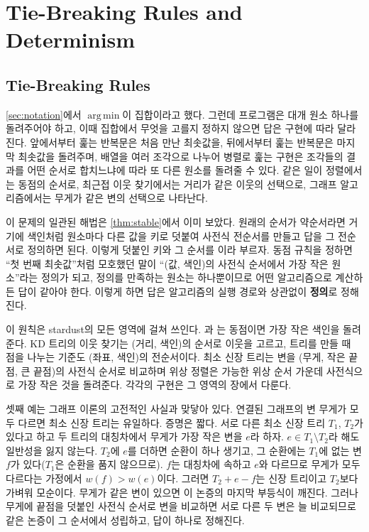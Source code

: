 \section{Tie-Breaking Rules and Determinism}
\label{sec:ties}

\subsection{Tie-Breaking Rules}

\cref{sec:notation}에서 $\operatorname{arg\,min}$이 집합이라고 했다. 그런데 프로그램은 대개 원소 하나를 돌려주어야 하고, 이때 집합에서 무엇을 고를지 정하지 않으면 답은 구현에 따라 달라진다. 앞에서부터 훑는 반복문은 처음 만난 최솟값을, 뒤에서부터 훑는 반복문은 마지막 최솟값을 돌려주며, 배열을 여러 조각으로 나누어 병렬로 훑는 구현은 조각들의 결과를 어떤 순서로 합치느냐에 따라 또 다른 원소를 돌려줄 수 있다. 같은 일이 정렬에서는 동점의 순서로, 최근접 이웃 찾기에서는 거리가 같은 이웃의 선택으로, 그래프 알고리즘에서는 무게가 같은 변의 선택으로 나타난다.

이 문제의 일관된 해법은 \cref{thm:stable}에서 이미 보았다. 원래의 순서가 약순서라면 거기에 색인처럼 원소마다 다른 값을 키로 덧붙여 사전식 전순서를 만들고 답을 그 전순서로 정의하면 된다. 이렇게 덧붙인 키와 그 순서를 이라 부르자. 동점 규칙을 정하면 ``첫 번째 최솟값''처럼 모호했던 말이 ``(값, 색인)의 사전식 순서에서 가장 작은 원소''라는 정의가 되고, 정의를 만족하는 원소는 하나뿐이므로 어떤 알고리즘으로 계산하든 답이 같아야 한다. 이렇게 하면 답은 알고리즘의 실행 경로와 상관없이 \textbf{정의}로 정해진다.

이 원칙은 stardust의 모든 영역에 걸쳐 쓰인다. 과 는 동점이면 가장 작은 색인을 돌려준다. KD 트리의 이웃 찾기는 (거리, 색인)의 순서로 이웃을 고르고, 트리를 만들 때 점을 나누는 기준도 (좌표, 색인)의 전순서이다. 최소 신장 트리는 변을 (무게, 작은 끝점, 큰 끝점)의 사전식 순서로 비교하며 위상 정렬은 가능한 위상 순서 가운데 사전식으로 가장 작은 것을 돌려준다. 각각의 구현은 그 영역의 장에서 다룬다.

셋째 예는 그래프 이론의 고전적인 사실과 맞닿아 있다. 연결된 그래프의 변 무게가 모두 다르면 최소 신장 트리는 유일하다\cite{kruskal1956,cormen2022clrs}. 증명은 짧다. 서로 다른 최소 신장 트리 $T_1$, $T_2$가 있다고 하고 두 트리의 대칭차에서 무게가 가장 작은 변을 $e$라 하자. $e\in T_1\setminus T_2$라 해도 일반성을 잃지 않는다. $T_2$에 $e$를 더하면 순환이 하나 생기고, 그 순환에는 $T_1$에 없는 변 $f$가 있다($T_1$은 순환을 품지 않으므로). $f$는 대칭차에 속하고 $e$와 다르므로 무게가 모두 다르다는 가정에서 $w(f)>w(e)$이다. 그러면 $T_2+e-f$는 신장 트리이고 $T_2$보다 가벼워 모순이다. 무게가 같은 변이 있으면 이 논증의 마지막 부등식이 깨진다. 그러나 무게에 끝점을 덧붙인 사전식 순서로 변을 비교하면 서로 다른 두 변은 늘 비교되므로 같은 논증이 그 순서에서 성립하고, 답이 하나로 정해진다.

